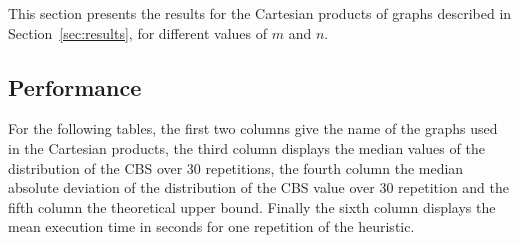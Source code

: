 \documentclass{scrartcl}
\theoremstyle{plain}
\newcommand{\cbs}{CBS}
\begin{document}
This section presents the results for the Cartesian products of graphs described 
in Section~\ref{sec:results}, for different values of $m$ and $n$. 



\subsection{Performance}

For the following tables, the first two columns give the name of the graphs 
used in the Cartesian products, the third column displays the median values of 
the distribution of the \cbs{} over 30 repetitions, the fourth column the 
median absolute deviation of the distribution of the \cbs{} value over 30 
repetition and the fifth column the theoretical upper bound. Finally the sixth 
column displays the mean execution time in seconds for one repetition of the 
heuristic.
\end{document}
